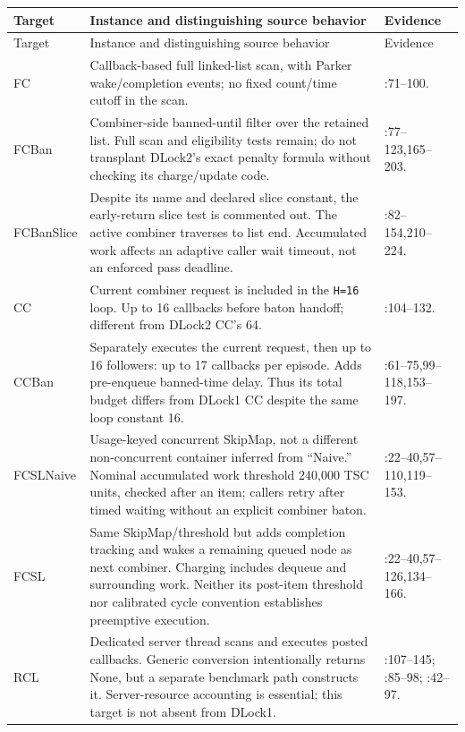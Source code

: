 \small
\begin{longtable}{@{}P{0.14\textwidth}P{0.51\textwidth}P{0.27\textwidth}@{}}
\toprule
Target & Instance and distinguishing source behavior & Evidence \\
\midrule
\endfirsthead
\toprule Target & Instance and distinguishing source behavior & Evidence \\
\midrule
\endhead
\bottomrule
\endfoot
FC & Callback-based full linked-list scan, with Parker wake/completion events; no fixed count/time cutoff in the scan. & :71--100. \\
\addlinespace
FCBan & Combiner-side banned-until filter over the retained list. Full scan and eligibility tests remain; do not transplant DLock2's exact penalty formula without checking its charge/update code. & :77--123,165--203. \\
\addlinespace
FCBanSlice & Despite its name and declared slice constant, the early-return slice test is commented out. The active combiner traverses to list end. Accumulated work affects an adaptive caller wait timeout, not an enforced pass deadline. & :82--154,210--224. \\
\addlinespace
CC & Current combiner request is included in the \texttt{H=16} loop. Up to 16 callbacks before baton handoff; different from DLock2 CC's 64. & :104--132. \\
\addlinespace
CCBan & Separately executes the current request, then up to 16 followers: up to 17 callbacks per episode. Adds pre-enqueue banned-time delay. Thus its total budget differs from DLock1 CC despite the same loop constant 16. & :61--75,99--118,153--197. \\
\addlinespace
FCSLNaive & Usage-keyed concurrent SkipMap, not a different non-concurrent container inferred from ``Naive.'' Nominal accumulated work threshold 240,000 TSC units, checked after an item; callers retry after timed waiting without an explicit combiner baton. & :22--40,57--110,119--153. \\
\addlinespace
FCSL & Same SkipMap/threshold but adds completion tracking and wakes a remaining queued node as next combiner. Charging includes dequeue and surrounding work. Neither its post-item threshold nor calibrated cycle convention establishes preemptive execution. & :22--40,57--126,134--166. \\
\addlinespace
RCL & Dedicated server thread scans and executes posted callbacks. Generic conversion intentionally returns None, but a separate benchmark path constructs it. Server-resource accounting is essential; this target is not absent from DLock1. & :107--145; :85--98; :42--97. \\

\end{longtable}
